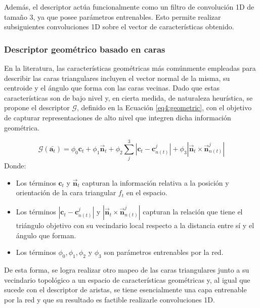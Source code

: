 Además, el descriptor actúa funcionalmente como un filtro de convolución 1D de tamaño 3, ya que posee parámetros entrenables. Esto permite realizar subsiguientes convoluciones 1D sobre el vector de características obtenido.

\subsubsection{Descriptor geométrico basado en caras}
En la literatura, las características geométricas más comúnmente empleadas para describir las caras triangulares incluyen el vector normal de la misma, su centroide y el ángulo que forma con las caras vecinas. Dado que estas características son de bajo nivel y, en cierta medida, de naturaleza heurística, se propone el descriptor $\mathcal{G}$, definido en la Ecuación \ref{eq4:geometric}, con el objetivo de capturar representaciones de alto nivel que integren dicha información geométrica.

\begin{equation}
\label{eq4:geometric}
    \mathcal{G}(\bar{\textbf{a}_{t}}) = \phi_{0} \textbf{c}_{t} + \phi_{1} \overrightarrow{\textbf{n}}_{t} + \phi_{2} \sum_{j}^{3} | \textbf{c}_{t} - \textbf{c}_{n(t)}^{j} | + \phi_{3} | \overrightarrow{\textbf{n}}_{t} \times \overrightarrow{\textbf{n}}_{n(t)}^j |
\end{equation}
Donde:
\begin{itemize}
    \item Los términos $\textbf{c}_{t}$ y $\overrightarrow{\textbf{n}}_{t}$ capturan la información relativa a la posición y orientación de la cara triangular $f_t$ en el espacio.
    \item Los términos $| \textbf{c}_{t} - \textbf{c}_{n(t)}^{j} |$ y $| \overrightarrow{\textbf{n}}_{t} \times \overrightarrow{\textbf{n}}_{n(t)}^j |$ capturan la relación que tiene el triángulo objetivo con su vecindario local respecto a la distancia entre sí y el ángulo que forman.
    \item Los términos $\phi_{0}, \phi_{1}, \phi_{2} $ y $\phi_{3}$ son parámetros entrenables por la red.
\end{itemize}

De esta forma, se logra realizar otro mapeo de las caras triangulares junto a su vecindario topológico a un espacio de características geométricas y, al igual que sucede con el descriptor de aristas, se tiene esencialmente una capa entrenable por la red y que su resultado es factible realizarle convoluciones 1D.


